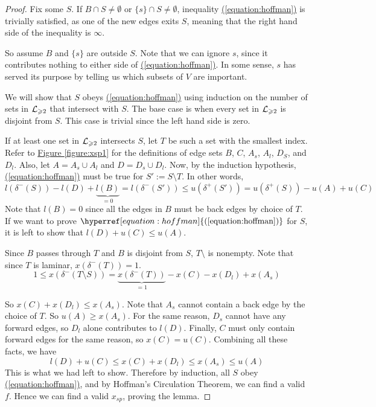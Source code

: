 \documentclass[./main.tex]{subfiles}
\begin{document}
\begin{proof}
			Fix some $S$. If $B\cap S\neq \emptyset$ or $\{s\}\cap S\neq \emptyset$, inequality \hyperref[equation:hoffman]{(\ref{equation:hoffman})} is trivially satisfied, as one of the new edges exits $S$, meaning that the right hand side of the inequality is $\infty$.

			So assume $B$ and $\{s\}$ are outside $S$. Note that we can ignore $s$, since it contributes nothing to either side of \hyperref[equation:hoffman]{(\ref{equation:hoffman})}. In some sense, $s$ has served its purpose by telling us which subsets of $V$ are important.

			We will show that $S$ obeys \hyperref[equation:hoffman]{(\ref{equation:hoffman})} using induction on the number of sets in $\mathcal{L}_{\geqslant 2}$ that intersect with $S$. The base case is when every set in $\mathcal{L}_{\geqslant 2}$ is disjoint from $S$. This case is trivial since the left hand side is zero.

			If at least one set in $\mathcal{L}_{\geqslant 2}$ intersects $S$, let $T$ be such a set with the smallest index. Refer to \hyperref[figure:xsp1]{Figure \ref{figure:xsp1}} for the definitions of edge sets $B$, $C$, $A_s$, $A_l$, $D_S$, and $D_l$.
			Also, let $A = A_s\cup A_l$ and $D = D_s\cup D_l$. 
			Now, by the induction hypothesis, \hyperref[equation:hoffman]{(\ref{equation:hoffman})} must be true for $S':=S\setminus T$. In other words, 
			\[ 
				l(\delta^-(S)) - l(D) + \underbrace{l(B)}_{=0} = l(\delta^-(S'))\leq u(\delta^+(S')) = u(\delta^+(S)) - u(A) + u(C) 
			\]
			Note that $l(B) = 0$ since all the edges in $B$ must be back edges by choice of $T$. If we want to prove $\hyperref[equation:hoffman]{(\ref{equation:hoffman})}$ for $S$, it is left to show that $l(D) + u(C)\leq u(A)$.

			Since $B$ passes through $T$ and $B$ is disjoint from $S$, $T\setminus$ is nonempty. Note that since $T$ is laminar, $x(\delta^-(T)) = 1$. \[ 1\leq x(\delta^-(T\setminus S))=\underbrace{x(\delta^-(T))}_{=1} - x(C) - x(D_l) + x(A_s) \]

			So $x(C) + x(D_l)\leq x(A_s)$. Note that $A_s$ cannot contain a back edge by the choice of $T$. So $u(A)\geq x(A_s)$. For the same reason, $D_s$ cannot have any forward edges, so $D_l$ alone contributes to $l(D)$. Finally, $C$ must only contain forward edges for the same reason, so $x(C) = u(C)$. Combining all these facts, we have \[l(D) + u(C)\leq x(C) + x(D_l)\leq x(A_s)\leq u(A)\]
			This is what we had left to show. Therefore by induction, all $S$ obey \hyperref[equation:hoffman]{(\ref{equation:hoffman})}, and by Hoffman's Circulation Theorem, we can find a valid $f$. Hence we can find a valid $x_{sp}$, proving the lemma.
	\end{proof}
	\vspace{5mm}
\end{document}
